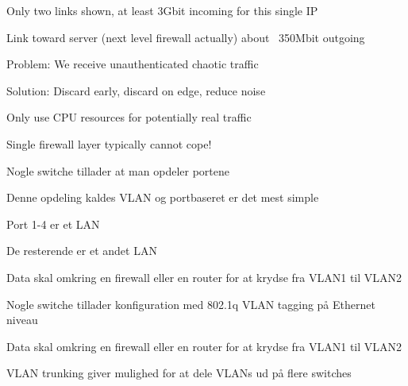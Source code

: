 \documentclass[20pt,landscape,a4paper,footrule]{foils}
\begin{document}
\centerline{Only two links shown, at least 3Gbit incoming for this single IP}

\centerline{Link toward server (next level firewall actually) about ~350Mbit outgoing}

\begin{list1}
\item Problem: We receive unauthenticated chaotic traffic

\item Solution: Discard early, discard on edge, reduce noise

\item Only use CPU resources for potentially real traffic
\end{list1}

\centerline{Single firewall layer typically cannot cope!}





\begin{list1}
\item Nogle switche tillader at man opdeler portene
\item Denne opdeling kaldes VLAN og portbaseret er det mest simple
\item Port 1-4 er et LAN
\item De resterende er et andet LAN
\item Data skal omkring en firewall eller en router for at krydse fra VLAN1 til VLAN2
\end{list1}



\begin{list1}
\item Nogle switche tillader konfiguration med 802.1q VLAN tagging på Ethernet niveau
\item Data skal omkring en firewall eller en router for at krydse fra VLAN1 til VLAN2
\item VLAN trunking giver mulighed for at dele VLANs ud på flere switches
\end{list1}

\end{document}
